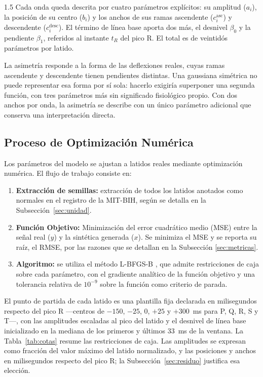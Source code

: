 \begin{spacing}{1.5}
Cada onda queda descrita por cuatro parámetros explícitos: su amplitud ($a_i$), la posición de su centro ($b_i$) y los anchos de sus ramas ascendente ($c_i^{\text{asc}}$) y descendente ($c_i^{\text{desc}}$). El término de línea base aporta dos más, el desnivel $\beta_0$ y la pendiente $\beta_1$, referidos al instante $t_R$ del pico R. El total es de veintidós parámetros por latido.

La asimetría responde a la forma de las deflexiones reales, cuyas ramas ascendente y descendente tienen pendientes distintas. Una gaussiana simétrica no puede representar esa forma por sí sola: hacerlo exigiría superponer una segunda función, con tres parámetros más sin significado fisiológico propio. Con dos anchos por onda, la asimetría se describe con un único parámetro adicional que conserva una interpretación directa.

\subsection{Proceso de Optimización Numérica}

Los parámetros del modelo se ajustan a latidos reales mediante optimización numérica. El flujo de trabajo consiste en:

\begin{enumerate}
    \item \textbf{Extracción de semillas:} extracción de todos los latidos anotados como normales en el registro de la MIT-BIH, según se detalla en la Subsección~\ref{sec:unidad}.
    \item \textbf{Función Objetivo:} Minimización del error cuadrático medio (MSE) entre la señal real ($y$) y la sintética generada ($x$). Se minimiza el MSE y se reporta su raíz, el RMSE, por las razones que se detallan en la Subsección \ref{sec:metricas}.
    \item \textbf{Algoritmo:} se utiliza el método L-BFGS-B \cite{byrd1995limited}, que admite restricciones de caja sobre cada parámetro, con el gradiente analítico de la función objetivo y una tolerancia relativa de $10^{-9}$ sobre la función como criterio de parada.
\end{enumerate}

El punto de partida de cada latido es una plantilla fija declarada en milisegundos respecto del pico R ---centros de $-150$, $-25$, $0$, $+25$ y $+300$~ms para P, Q, R, S y T---, con las amplitudes escaladas al pico del latido y el desnivel de línea base inicializado en la mediana de los primeros y últimos 33~ms de la ventana. La Tabla~\ref{tab:cotas} resume las restricciones de caja. Las amplitudes se expresan como fracción del valor máximo del latido normalizado, y las posiciones y anchos en milisegundos respecto del pico R; la Subsección~\ref{sec:residuo} justifica esa elección.


\end{spacing}
